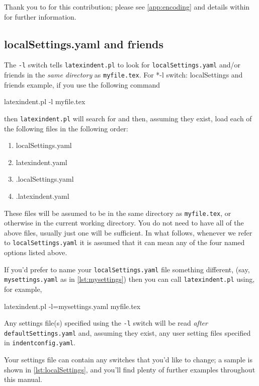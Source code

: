  Thank you to \cite{qiancy98} for this contribution; please see \vref{app:encoding} and
 details within \cite{encoding} for further information.

\subsection{localSettings.yaml and friends}\label{sec:localsettings}
 The \texttt{-l} switch tells \texttt{latexindent.pl} to look for
 \texttt{localSettings.yaml} and/or friends in the \emph{same directory} as
 \texttt{myfile.tex}. For%
 *{-l
 switch: localSettings and friends} example, if you use the following command

 \begin{commandshell}
latexindent.pl -l myfile.tex
\end{commandshell}

 then \texttt{latexindent.pl} will search for and then, assuming they exist, load each of
 the following files in the following order:
 \begin{enumerate}
  \item localSettings.yaml
  \item latexindent.yaml
  \item .localSettings.yaml
  \item .latexindent.yaml
 \end{enumerate}
 These files will be assumed to be in the same directory as \texttt{myfile.tex}, or
 otherwise in the current working directory. You do not need to have all of the above
 files, usually just one will be sufficient. In what follows, whenever we refer to
 \texttt{localSettings.yaml} it is assumed that it can mean any of the four named options
 listed above.

 If you'd prefer to name your \texttt{localSettings.yaml} file something different, (say,
 \texttt{mysettings.yaml} as in \cref{lst:mysettings}) then you can call
 \texttt{latexindent.pl} using, for example,

 \begin{commandshell}
latexindent.pl -l=mysettings.yaml myfile.tex
\end{commandshell}

 Any settings file(s) specified using the \texttt{-l} switch will be read \emph{after}
 \texttt{defaultSettings.yaml} and, assuming they exist, any user setting files specified
 in \texttt{indentconfig.yaml}.

 Your settings file can contain any switches that you'd like to change; a sample is shown
 in \cref{lst:localSettings}, and you'll find plenty of further examples throughout this
 manual. 

